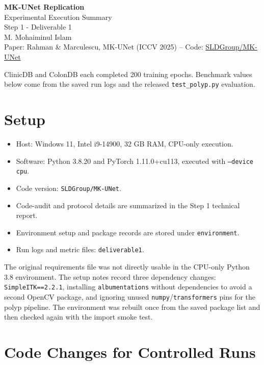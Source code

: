 \documentclass[10pt,a4paper]{article}
\begin{document}
\begin{center}
{\LARGE\bfseries MK-UNet Replication}\\[3pt]
{\large Experimental Execution Summary}\\[4pt]
{\small Step 1 - Deliverable 1}\\[3pt]
{\normalsize M. Mohaiminul Islam}\\[3pt]
{\footnotesize Paper: Rahman \& Marculescu, MK-UNet (ICCV 2025) \quad--\quad
Code: \href{https://github.com/SLDGroup/MK-UNet.git}{SLDGroup/MK-UNet}}
\end{center}
\vspace{0.25em}

\noindent  ClinicDB and ColonDB each completed 200 training epochs. Benchmark values below come from the saved run logs and the released \texttt{test\_polyp.py} evaluation.

\section{Setup}

\begin{itemize}
\item Host: Windows 11, Intel i9-14900, 32 GB RAM, CPU-only execution.
\item Software: Python 3.8.20 and PyTorch 1.11.0+cu113, executed with \texttt{--device cpu}.
\item Code version: \texttt{SLDGroup/MK-UNet}.
\item Code-audit and protocol details are summarized in the Step 1 technical report.
\item Environment setup and package records are stored under \texttt{environment}.
\item Run logs and metric files: \texttt{deliverable1}.
\end{itemize}

The original requirements file was not directly usable in the CPU-only Python 3.8 environment. The setup notes record three dependency changes: \texttt{SimpleITK==2.2.1}, installing \texttt{albumentations} without dependencies to avoid a second OpenCV package, and ignoring unused \texttt{numpy}/\texttt{transformers} pins for the polyp pipeline. The environment was rebuilt once from the saved package list and then checked again with the import smoke test.

\section{Code Changes for Controlled Runs}
\end{document}
